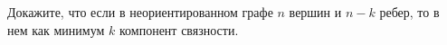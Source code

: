 Докажите, что если в неориентированном графе $n$ вершин и $n - k$ ребер, то в нем как минимум $k$
компонент связности.
